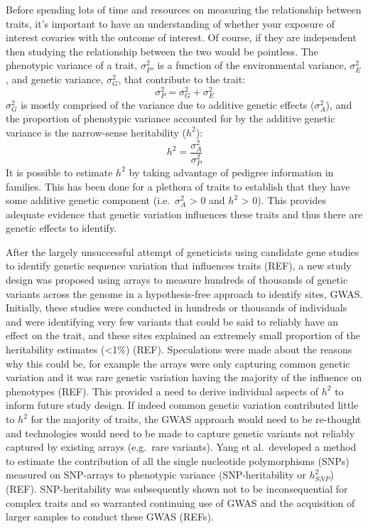 \documentclass[11pt,twoside]{bristolthesis}
\begin{document}
Before spending lots of time and resources on measuring the relationship between traits, it's important to have an understanding of whether your exposure of interest covaries with the outcome of interest. Of course, if they are independent then studying the relationship between the two would be pointless. The phenotypic variance of a trait, \(\sigma^2_{P}\), is a function of the environmental variance, \(\sigma^2_{E}\), and genetic variance, \(\sigma^2_{G}\), that contribute to the trait:
\begin{equation}
  \sigma^2_{P} = \sigma^2_{G} + \sigma^2_{E}
  \label{eq:phenotypic-variance}
\end{equation}
\(\sigma^2_{G}\) is mostly comprised of the variance due to additive genetic effects (\(\sigma^2_{A}\)), and the proportion of phenotypic variance accounted for by the additive genetic variance is the narrow-sense heritability (\(h^2\)):
\begin{equation}
  h^2 = \frac{\sigma^2_{A}} {\sigma^2_{P}}
  \label{eq:narrow-sense-heritability}
\end{equation}
It is possible to estimate \(h^2\) by taking advantage of pedigree information in families. This has been done for a plethora of traits to establish that they have some additive genetic component (i.e.~\(\sigma^2_{A}\) \textgreater{} 0 and \(h^2\) \textgreater{} 0). This provides adequate evidence that genetic variation influences these traits and thus there are genetic effects to identify.

After the largely unsuccessful attempt of geneticists using candidate gene studies to identify genetic sequence variation that influences traits (REF), a new study design was proposed using arrays to measure hundreds of thousands of genetic variants across the genome in a hypothesis-free approach to identify sites, GWAS. Initially, these studies were conducted in hundreds or thousands of individuals and were identifying very few variants that could be said to reliably have an effect on the trait, and these sites explained an extremely small proportion of the heritability estimates (\textless1\%) (REF). Speculations were made about the reasons why this could be, for example the arrays were only capturing common genetic variation and it was rare genetic variation having the majority of the influence on phenotypes (REF). This provided a need to derive individual aspects of \(h^2\) to inform future study design. If indeed common genetic variation contributed little to \(h^2\) for the majority of traits, the GWAS approach would need to be re-thought and technologies would need to be made to capture genetic variants not reliably captured by existing arrays (e.g.~rare variants). Yang et al.~developed a method to estimate the contribution of all the single nucleotide polymorphisms (SNPs) measured on SNP-arrays to phenotypic variance (SNP-heritability or \(h^2_{SNP}\)) (REF). SNP-heritability was subsequently shown not to be inconsequential for complex traits and so warranted continuing use of GWAS and the acquisition of larger samples to conduct these GWAS (REFs).
\end{document}
